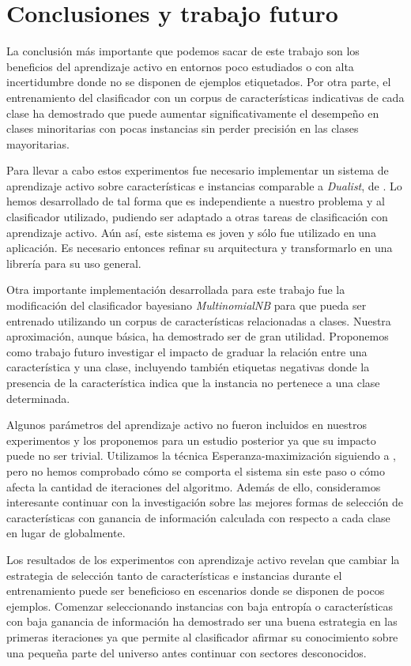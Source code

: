 
\chapter*{Conclusiones y trabajo futuro}

La conclusión más importante que podemos sacar de este trabajo son los beneficios del aprendizaje activo en entornos poco estudiados o con alta incertidumbre donde no se disponen de ejemplos etiquetados. Por otra parte, el entrenamiento del clasificador con un corpus de características indicativas de cada clase ha demostrado que puede aumentar significativamente el desempeño en clases minoritarias con pocas instancias sin perder precisión en las clases mayoritarias.

Para llevar a cabo estos experimentos fue necesario implementar un sistema de aprendizaje activo sobre características e instancias comparable a \textit{Dualist}, de \citet{dualist}. Lo hemos desarrollado de tal forma que es independiente a nuestro problema y al clasificador utilizado, pudiendo ser adaptado a otras tareas de clasificación con aprendizaje activo. Aún así, este sistema es joven y sólo fue utilizado en una aplicación. Es necesario entonces refinar su arquitectura y transformarlo en una librería para su uso general.

Otra importante implementación desarrollada para este trabajo fue la modificación del clasificador bayesiano \textit{MultinomialNB} para que pueda ser entrenado utilizando un corpus de características relacionadas a clases. Nuestra aproximación, aunque básica, ha demostrado ser de gran utilidad. Proponemos como trabajo futuro investigar el impacto de graduar la relación entre una característica y una clase, incluyendo también etiquetas negativas donde la presencia de la característica indica que la instancia no pertenece a una clase determinada.

Algunos parámetros del aprendizaje activo no fueron incluidos en nuestros experimentos y los proponemos para un estudio posterior ya que su impacto puede no ser trivial. Utilizamos la técnica Esperanza-maximización siguiendo a \citet{dualist}, pero no hemos comprobado cómo se comporta el sistema sin este paso o cómo afecta la cantidad de iteraciones del algoritmo. Además de ello, consideramos interesante continuar con la investigación sobre las mejores formas de selección de características con ganancia de información calculada con respecto a cada clase en lugar de globalmente.

Los resultados de los experimentos con aprendizaje activo revelan que cambiar la estrategia de selección tanto de características e instancias durante el entrenamiento puede ser beneficioso en escenarios donde se disponen de pocos ejemplos. Comenzar seleccionando instancias con baja entropía o características con baja ganancia de información ha demostrado ser una buena estrategia en las primeras iteraciones ya que permite al clasificador afirmar su conocimiento sobre una pequeña parte del universo antes continuar con sectores desconocidos.

